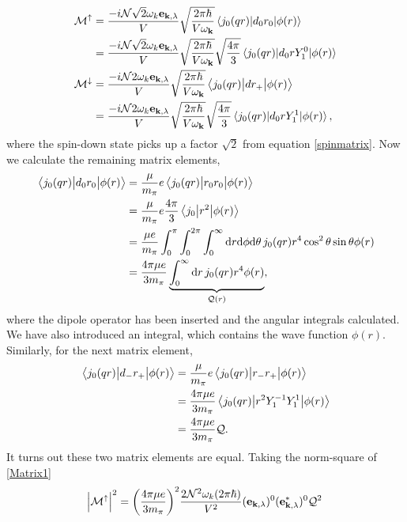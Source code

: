 \begin{align}
	\mathcal{M}^{\uparrow} &=\frac{-i\mathcal{N}\sqrt{2}\omega_k\bm{\mathrm{e}}_{\bm{\mathrm{k}},\lambda}}{V}\sqrt{\frac{2\pi\hbar}{V\omega_{\bm{\mathrm{k}}}}}\mel*{j_0(qr)}{d_0 r_0}{\phi(r)}  \\
	&= \frac{-i\mathcal{N}\sqrt{2}\omega_k\bm{\mathrm{e}}_{\bm{\mathrm{k}},\lambda}}{V}\sqrt{\frac{2\pi\hbar}{V\omega_{\bm{\mathrm{k}}}}}\sqrt{\frac{4\pi}{3}}\mel*{j_0(qr)}{d_0 r Y_1^0}{\phi(r)} \\
	\mathcal{M}^{\downarrow} & = \frac{-i\mathcal{N}2\omega_k\bm{\mathrm{e}}_{\bm{\mathrm{k}},\lambda}}{V}\sqrt{\frac{2\pi\hbar}{V\omega_{\bm{\mathrm{k}}}}} \mel{j_0(qr)}{d r_{+}}{\phi(r)}\\
	&=\frac{-i\mathcal{N}2\omega_k\bm{\mathrm{e}}_{\bm{\mathrm{k}},\lambda}}{V}\sqrt{\frac{2\pi\hbar}{V\omega_{\bm{\mathrm{k}}}}}\sqrt{\frac{4\pi}{3}}\mel*{j_0(qr)}{d_0 r Y_1^1}{\phi(r)}, \\
\end{align}
where the spin-down state picks up a factor $\sqrt{2}$ from equation \eqref{spinmatrix}. Now we calculate the remaining matrix elements,
\begin{align}
	\mel{j_0(qr)}{d_0 r_0}{\phi(r)} &= \frac{\mu}{m_\pi}e \mel{j_0(qr)}{r_0r_0}{\phi(r)} \\
	&= \frac{\mu}{m_\pi}e\frac{4\pi}{3} \mel{j_0}{r^2}{\phi(r)} \\
	&= \frac{\mu e }{m_\pi} \int_0^\pi \int_0^{2\pi} \int_0^\infty \text{d}r \text{d}\phi \text{d}\theta \, j_0(qr)r^4\cos^2\theta \sin\theta \phi(r) \\
	&= \frac{4\pi \mu e}{3m_\pi} \underbrace{\int_0^\infty \text{d}r \, j_0(qr)r^4\phi(r)}_{\mathcal{Q}(r)}, \label{Matrix1}
\end{align}
where the dipole operator has been inserted and the angular integrals calculated. We have also introduced an integral, which contains the wave function $\phi(r)$. Similarly, for the next matrix element,
\begin{align}
	\mel{j_0(qr)}{d_{-}r_{+}}{\phi(r)} &= \frac{\mu}{m_\pi}e \mel{j_0(qr)}{r_{-}r_{+}}{\phi(r)} \\
	&= \frac{4\pi \mu e}{3 m_\pi} \mel{j_0(qr)}{r^2 Y_1^{-1}Y_1^1}{\phi(r)} \\
	&= \frac{4\pi \mu e}{3 m_\pi} \mathcal{Q}. \label{Matrix2}
\end{align}
It turns out these two matrix elements are equal. Taking the norm-square of \eqref{Matrix1}
\begin{equation}
	\abs{\mathcal{M}^\uparrow}^2 = \bigg( \frac{4\pi \mu e}{3m_\pi}\bigg)^2 \frac{2 \mathcal{N}^2\omega_k (2\pi \hbar)}{V^2}(\bm{\mathrm{e}}_{\bm{\mathrm{k}},\lambda})^0(\bm{\mathrm{e}}_{\bm{\mathrm{k}},\lambda}^*)^0 \mathcal{Q}^2 
\end{equation}

